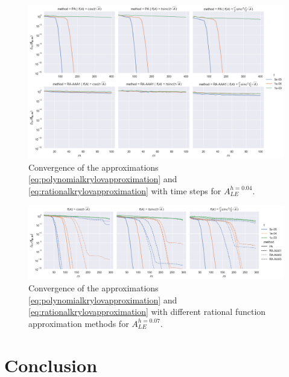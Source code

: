\begin{figure}[h]
    \centering
    \includegraphics[width=.9\textwidth]{img/trigonometric/cnvg_h4e-02_methods_PA:RA.png}
    \caption{
        Convergence of the approximations \eqref{eq:polynomialkrylovapproximation}
        and \eqref{eq:rationalkrylovapproximation} with time steps for $A_{LE}^{h=0.04}$.
        }
        \label{fig:trigonometricconvergencetimesteps}
\end{figure}

\begin{figure}[h]
        \centering
        \includegraphics[width=.9\textwidth]{img/trigonometric/cnvg_h7e-02_methods.png}
        \caption{
            Convergence of the approximations \eqref{eq:polynomialkrylovapproximation}
            and \eqref{eq:rationalkrylovapproximation} with different
            rational function approximation methods for $A_{LE}^{h=0.07}$.
        }
        \label{fig:trigonometricconvergencemethods}
\end{figure}

\section{Conclusion}
\label{sec:conclusion}

